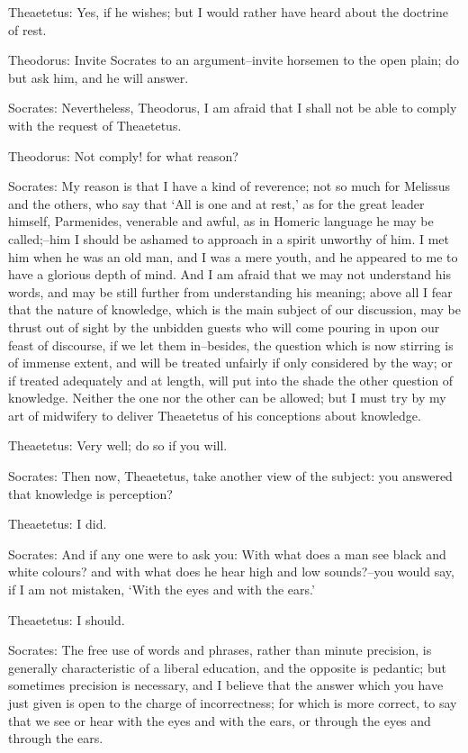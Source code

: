 Theaetetus: Yes, if he wishes; but I would rather have heard about the
doctrine of rest.

Theodorus: Invite Socrates to an argument--invite horsemen to the open
plain; do but ask him, and he will answer.

Socrates: Nevertheless, Theodorus, I am afraid that I shall not be able
to comply with the request of Theaetetus.

Theodorus: Not comply! for what reason?

Socrates: My reason is that I have a kind of reverence; not so much for
Melissus and the others, who say that `All is one and at rest,' as for
the great leader himself, Parmenides, venerable and awful, as in Homeric
language he may be called;--him I should be ashamed to approach in a
spirit unworthy of him. I met him when he was an old man, and I was a
mere youth, and he appeared to me to have a glorious depth of mind.
And I am afraid that we may not understand his words, and may be still
further from understanding his meaning; above all I fear that the nature
of knowledge, which is the main subject of our discussion, may be thrust
out of sight by the unbidden guests who will come pouring in upon our
feast of discourse, if we let them in--besides, the question which is
now stirring is of immense extent, and will be treated unfairly if only
considered by the way; or if treated adequately and at length, will put
into the shade the other question of knowledge. Neither the one nor the
other can be allowed; but I must try by my art of midwifery to deliver
Theaetetus of his conceptions about knowledge.

Theaetetus: Very well; do so if you will.

Socrates: Then now, Theaetetus, take another view of the subject: you
answered that knowledge is perception?

Theaetetus: I did.

Socrates: And if any one were to ask you: With what does a man see black
and white colours? and with what does he hear high and low sounds?--you
would say, if I am not mistaken, `With the eyes and with the ears.'

Theaetetus: I should.

Socrates: The free use of words and phrases, rather than minute
precision, is generally characteristic of a liberal education, and
the opposite is pedantic; but sometimes precision is necessary, and I
believe that the answer which you have just given is open to the charge
of incorrectness; for which is more correct, to say that we see or hear
with the eyes and with the ears, or through the eyes and through the
ears.

